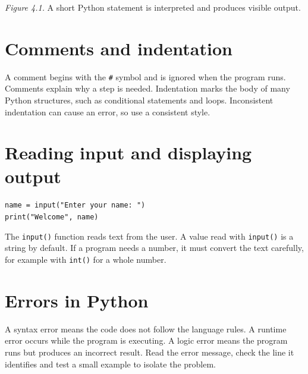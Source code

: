 \documentclass[11pt,openany,oneside]{book}
\begin{document}
\begin{center}
\end{center}
\textit{Figure 4.1.} A short Python statement is interpreted and produces visible output.

\section{Comments and indentation}
A comment begins with the \texttt{\#} symbol and is ignored when the program runs. Comments explain why a step is needed. Indentation marks the body of many Python structures, such as conditional statements and loops. Inconsistent indentation can cause an error, so use a consistent style.

\section{Reading input and displaying output}
\begin{tcolorbox}[colback=SoftGray,colframe=Navy,boxrule=.5pt,arc=1mm]
\texttt{name = input("Enter your name: ")}\\
\texttt{print("Welcome", name)}
\end{tcolorbox}
The \texttt{input()} function reads text from the user. A value read with \texttt{input()} is a string by default. If a program needs a number, it must convert the text carefully, for example with \texttt{int()} for a whole number.

\section{Errors in Python}
A syntax error means the code does not follow the language rules. A runtime error occurs while the program is executing. A logic error means the program runs but produces an incorrect result. Read the error message, check the line it identifies and test a small example to isolate the problem.
\end{document}
